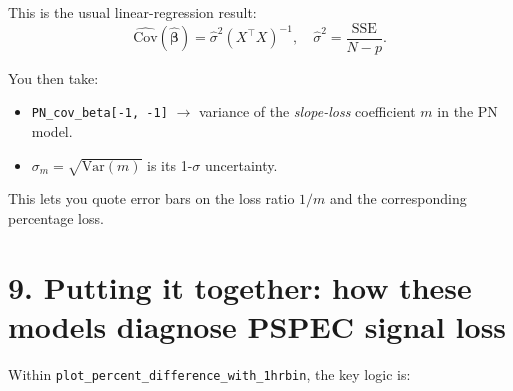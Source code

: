 \documentclass[11pt]{article}
\begin{document}
This is the usual linear-regression result:
\[
  \widehat{\mathrm{Cov}}(\hat{\boldsymbol{\beta}}) = \hat{\sigma}^2 (X^\top X)^{-1},
  \quad
  \hat{\sigma}^2 = \frac{\mathrm{SSE}}{N-p}.
\]

You then take:

\begin{itemize}[leftmargin=*]
  \item \texttt{PN\_cov\_beta[-1, -1]} $\rightarrow$ variance of the \emph{slope-loss} coefficient $m$ in the PN model.
  \item $\sigma_m = \sqrt{\mathrm{Var}(m)}$ is its 1-$\sigma$ uncertainty.
\end{itemize}

This lets you quote error bars on the loss ratio $1/m$ and the corresponding percentage loss.

\section*{9. Putting it together: how these models diagnose PSPEC signal loss}

Within \texttt{plot\_percent\_difference\_with\_1hrbin}, the key logic is:
\end{document}
